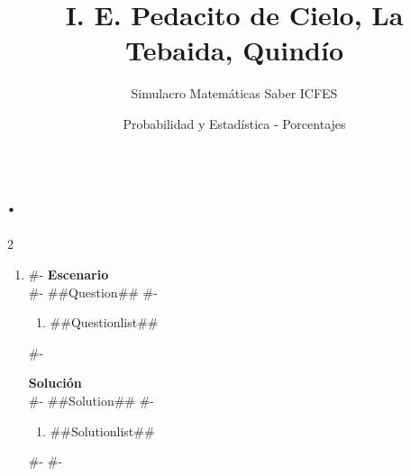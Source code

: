 \documentclass[12pt]{article}
\title{I. E. Pedacito de Cielo, La Tebaida, Quindío}
\author{Simulacro Matemáticas Saber ICFES}
\date{Probabilidad y Estadística - Porcentajes}
\begin{document}
\maketitle

\section*{.}

\begin{multicols}{2}

\begin{enumerate}[label=\arabic*.]
#-
  \item
#-
  \textbf{Escenario}\\
#-
  ##Question##
#-
  \begin{enumerate}[label=(\alph*)]
    \item ##Questionlist##
  \end{enumerate}
#-

  \textbf{Solución}\\
#-
  ##Solution##
#-
  \begin{enumerate}[label=(\alph*)]
    \item ##Solutionlist##
  \end{enumerate}
#-
#-
\end{enumerate}

\end{multicols}
\end{document}
